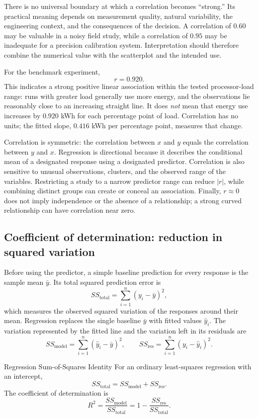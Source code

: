 There is no universal boundary at which a correlation becomes ``strong.'' Its practical meaning depends on measurement quality, natural variability, the engineering context, and the consequences of the decision. A correlation of $0.60$ may be valuable in a noisy field study, while a correlation of $0.95$ may be inadequate for a precision calibration system. Interpretation should therefore combine the numerical value with the scatterplot and the intended use.

For the benchmark experiment,
\[
r=0.920.
\]
This indicates a strong positive linear association within the tested processor-load range: runs with greater load generally use more energy, and the observations lie reasonably close to an increasing straight line. It does \emph{not} mean that energy use increases by $0.920$ kWh for each percentage point of load. Correlation has no units; the fitted slope, $0.416$ kWh per percentage point, measures that change.

Correlation is symmetric: the correlation between $x$ and $y$ equals the correlation between $y$ and $x$. Regression is directional because it describes the conditional mean of a designated response using a designated predictor. Correlation is also sensitive to unusual observations, clusters, and the observed range of the variables. Restricting a study to a narrow predictor range can reduce $|r|$, while combining distinct groups can create or conceal an association. Finally, $r\approx0$ does not imply independence or the absence of a relationship; a strong curved relationship can have correlation near zero.

\subsection{Coefficient of determination: reduction in squared variation}

Before using the predictor, a simple baseline prediction for every response is the sample mean $\bar y$. Its total squared prediction error is
\[
SS_{\text{total}}
=\sum_{i=1}^{n}(y_i-\bar y)^2,
\]
which measures the observed squared variation of the responses around their mean. Regression replaces the single baseline $\bar y$ with fitted values $\hat y_i$. The variation represented by the fitted line and the variation left in its residuals are
\[
SS_{\text{model}}
=\sum_{i=1}^{n}(\hat y_i-\bar y)^2,
\qquad
SS_{\text{res}}
=\sum_{i=1}^{n}(y_i-\hat y_i)^2.
\]

\begin{theorem}{Regression Sum-of-Squares Identity}
For an ordinary least-squares regression with an intercept,
\[
SS_{\text{total}}
=SS_{\text{model}}+SS_{\text{res}}.
\]
The coefficient of determination is
\[
R^2
=\frac{SS_{\text{model}}}{SS_{\text{total}}}
=1-\frac{SS_{\text{res}}}{SS_{\text{total}}}.
\]
\end{theorem}

